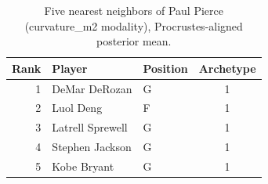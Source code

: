 \begin{table}[htbp]
  \centering\small
  \begin{tabular}{rllc}
    \toprule
    Rank & Player & Position & Archetype \\
    \midrule
    1 & DeMar DeRozan & G & 1 \\
    2 & Luol Deng & F & 1 \\
    3 & Latrell Sprewell & G & 1 \\
    4 & Stephen Jackson & G & 1 \\
    5 & Kobe Bryant & G & 1 \\
    \bottomrule
  \end{tabular}
  \caption{Five nearest neighbors of Paul Pierce (curvature_m2 modality), Procrustes-aligned posterior mean.}
  \label{tab:Paul_Pierce_neighbors_curvature_m2}
\end{table}

